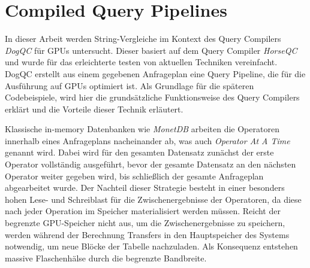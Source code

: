 \chapter{Compiled Query Pipelines}
\label{sec:pipelining}

In dieser Arbeit werden String-Vergleiche im Kontext des Query Compilers \emph{DogQC} für GPUs untersucht.
Dieser basiert auf dem Query Compiler \emph{HorseQC} \cite{Funke2018} und wurde für das erleichterte testen von aktuellen Techniken vereinfacht.
DogQC erstellt aus einem gegebenen Anfrageplan eine Query Pipeline, die für die Ausführung auf GPUs optimiert ist.
Als Grundlage für die späteren Codebeispiele, wird hier die grundsätzliche Funktionsweise des Query Compilers erklärt und die Vorteile dieser Technik erläutert.

Klassische in-memory Datenbanken wie \emph{MonetDB} arbeiten die Operatoren innerhalb eines Anfrageplans nacheinander ab, was auch \emph{Operator At A Time} genannt wird.
Dabei wird für den gesamten Datensatz zunächst der erste Operator vollständig ausgeführt, bevor der gesamte Datensatz an den nächsten Operator weiter gegeben wird, bis schließlich der gesamte Anfrageplan abgearbeitet wurde.
Der Nachteil dieser Strategie besteht in einer besonders hohen Lese- und Schreiblast für die Zwischenergebnisse der Operatoren, da diese nach jeder Operation im Speicher materialisiert werden müssen.
Reicht der begrenzte GPU-Speicher nicht aus, um die Zwischenergebnisse zu speichern, werden während der Berechnung Transfers in den Hauptspeicher des Systems notwendig, um neue Blöcke der Tabelle nachzuladen.
Als Konsequenz entstehen massive Flaschenhälse durch die begrenzte Bandbreite.

